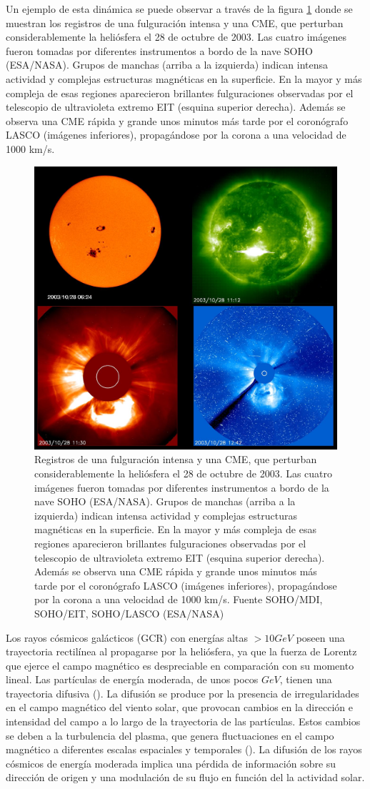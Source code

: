 Un ejemplo de esta dinámica se puede observar a través de la figura \ref{CME_2003} donde se muestran los registros de una fulguración intensa y una CME, que perturban considerablemente la heliósfera el 28 de octubre de 2003. Las cuatro imágenes fueron tomadas por diferentes instrumentos a bordo de la nave SOHO (ESA/NASA). Grupos de manchas (arriba a la izquierda) indican intensa actividad y complejas estructuras magnéticas en la superficie. En la mayor y más compleja de esas regiones aparecieron brillantes fulguraciones observadas por el telescopio de ultravioleta extremo EIT (esquina superior derecha). Además se observa una CME rápida y grande unos minutos más tarde por el coronógrafo LASCO (imágenes inferiores), propagándose por la corona a una velocidad de 1000 km/s.
\begin{figure}
    \centering
    \includegraphics[width=0.5\linewidth]{Figs/flare_2003-10-28.jpg}
    \caption{Registros de una fulguración intensa y una CME, que perturban considerablemente la heliósfera el 28 de octubre de 2003. Las cuatro imágenes fueron tomadas por diferentes instrumentos a bordo de la nave SOHO (ESA/NASA). Grupos de manchas (arriba a la izquierda) indican intensa actividad y complejas estructuras magnéticas en la superficie. En la mayor y más compleja de esas regiones aparecieron brillantes fulguraciones observadas por el telescopio de ultravioleta extremo EIT (esquina superior derecha). Además se observa una CME rápida y grande unos minutos más tarde por el coronógrafo LASCO (imágenes inferiores), propagándose por la corona a una velocidad de 1000 km/s. Fuente SOHO/MDI, SOHO/EIT, SOHO/LASCO (ESA/NASA)}
    \label{CME_2003}
\end{figure}
Los rayos cósmicos galácticos (GCR) con energías altas $>10GeV$ poseen una trayectoria rectilínea  al propagarse por la heliósfera, ya que la fuerza de Lorentz que ejerce el campo magnético es despreciable en comparación con su momento lineal. Las partículas de energía moderada, de unos pocos $GeV$, tienen una trayectoria difusiva (\cite{gaisser_2016}). La difusión se produce por la presencia de irregularidades en el campo magnético del viento solar, que provocan cambios en la dirección e intensidad del campo a lo largo de la trayectoria de las partículas. Estos cambios se deben a la turbulencia del plasma, que genera fluctuaciones en el campo magnético a diferentes escalas espaciales y temporales (\cite{spurio_2015}). La difusión de los rayos cósmicos de energía moderada implica una pérdida de información sobre su dirección de origen y una modulación de su flujo en función del la actividad solar.

